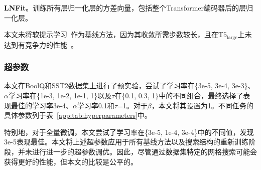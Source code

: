 \noindent\textbf{LNFit}。训练所有层归一化层的方差向量，包括整个Transformer编码器后的层归一化层。

本文未将软提示学习~\cite{lester2021power}作为基线方法，因为其收敛所需步数较长，且在$\text{T}5_{\text{large}}$上未达到有竞争力的性能~\cite{lester2021power}。


\subsubsection{超参数}
\label{app:hyperparameters}
本文在BoolQ和SST2数据集上进行了预实验，尝试了学习率在\{3e-5, 3e-4, 3e-3\}、$\alpha$学习率在\{1e-3, 1e-2, 1e-1, 1\}以及$\tau$在\{0.1, 0.3, 1\}中的不同组合，最终选择了表现最佳的学习率3e-4、$\alpha$学习率0.1和$\tau$=1。对于$\beta$，本文将其设置为1。不同任务的具体参数列于表~\ref{app:tab:hyperparameters}中。

特别地，对于全量微调，本文尝试了学习率在\{3e-5, 1e-4, 3e-4\}中的不同值，发现3e-5表现最佳。本文将上述超参数应用于所有基线方法以及搜索结构的重新训练阶段，并未进行进一步的超参数调优。因此，尽管通过数据集特定的网格搜索可能会获得更好的性能，但本文的比较是公平的。

